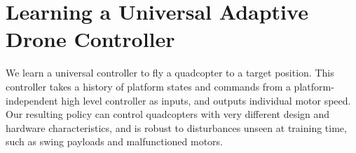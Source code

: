 \section{Learning a Universal Adaptive Drone Controller}
\label{sec:method}






We learn a universal controller to fly a quadcopter to a target position. This controller takes a history of platform states and commands from a platform-independent high level controller as inputs, and outputs individual motor speed. Our resulting policy can control quadcopters with very different design and hardware characteristics, and is robust to disturbances unseen at training time, such as swing payloads and malfunctioned motors.

